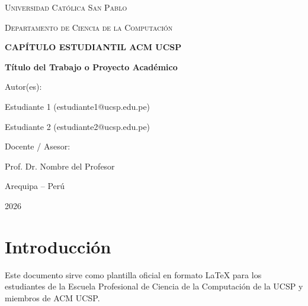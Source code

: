 \documentclass[12pt,a4paper]{article}
\begin{document}
\begin{titlepage}
    \centering
    \vspace*{1cm}
    {\scshape\LARGE Universidad Católica San Pablo \par}
    \vspace{0.5cm}
    {\scshape\Large Departamento de Ciencia de la Computación \par}
    \vspace{1.5cm}
    {\Large\bfseries CAPÍTULO ESTUDIANTIL ACM UCSP \par}
    \vspace{2cm}
    {\huge\bfseries Título del Trabajo o Proyecto Académico \par}
    \vspace{2cm}
    {\Large Autor(es): \par}
    {\large Estudiante 1 (estudiante1@ucsp.edu.pe) \par}
    {\large Estudiante 2 (estudiante2@ucsp.edu.pe) \par}
    \vfill
    {\large Docente / Asesor: \par}
    {\large Prof. Dr. Nombre del Profesor \par}
    \vfill
    {\large Arequipa -- Perú \par}
    {\large 2026 \par}
\end{titlepage}

\section{Introducción}
Este documento sirve como plantilla oficial en formato LaTeX para los estudiantes de la Escuela Profesional de Ciencia de la Computación de la UCSP y miembros de ACM UCSP.
\end{document}
